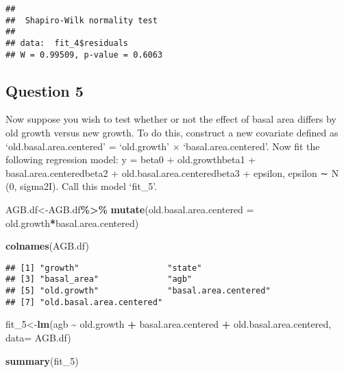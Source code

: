 \documentclass[
]{article}
\newenvironment{Shaded}{\begin{snugshade}}{\end{snugshade}}
\newcommand{\AttributeTok}[1]{\textcolor[rgb]{0.13,0.29,0.53}{#1}}
\newcommand{\FunctionTok}[1]{\textcolor[rgb]{0.13,0.29,0.53}{\textbf{#1}}}
\newcommand{\NormalTok}[1]{#1}
\newcommand{\OtherTok}[1]{\textcolor[rgb]{0.56,0.35,0.01}{#1}}
\newcommand{\SpecialCharTok}[1]{\textcolor[rgb]{0.81,0.36,0.00}{\textbf{#1}}}
\begin{document}
\begin{verbatim}
## 
##  Shapiro-Wilk normality test
## 
## data:  fit_4$residuals
## W = 0.99509, p-value = 0.6063
\end{verbatim}

\hypertarget{question-5}{%
\subsection{Question 5}\label{question-5}}

Now suppose you wish to test whether or not the effect of basal area
differs by old growth versus new growth. To do this, construct a new
covariate defined as `old.basal.area.centered' = `old.growth' ×
`basal.area.centered'. Now fit the following regression model: y = beta0
+ old.growthbeta1 + basal.area.centeredbeta2 +
old.basal.area.centeredbeta3 + epsilon, epsilon ∼ N (0, sigma2I). Call
this model `fit\_5'.

\begin{Shaded}
\begin{Highlighting}[]
\NormalTok{AGB.df}\OtherTok{\textless{}{-}}\NormalTok{AGB.df}\SpecialCharTok{\%\textgreater{}\%}
  \FunctionTok{mutate}\NormalTok{(}\AttributeTok{old.basal.area.centered =}\NormalTok{ old.growth}\SpecialCharTok{*}\NormalTok{basal.area.centered)}

\FunctionTok{colnames}\NormalTok{(AGB.df)}
\end{Highlighting}
\end{Shaded}

\begin{verbatim}
## [1] "growth"                  "state"                  
## [3] "basal_area"              "agb"                    
## [5] "old.growth"              "basal.area.centered"    
## [7] "old.basal.area.centered"
\end{verbatim}

\begin{Shaded}
\begin{Highlighting}[]
\NormalTok{fit\_5}\OtherTok{\textless{}{-}}\FunctionTok{lm}\NormalTok{(agb }\SpecialCharTok{\textasciitilde{}}\NormalTok{ old.growth }\SpecialCharTok{+}\NormalTok{ basal.area.centered }\SpecialCharTok{+}\NormalTok{ old.basal.area.centered, }\AttributeTok{data=}\NormalTok{ AGB.df)}

\FunctionTok{summary}\NormalTok{(fit\_5)}
\end{Highlighting}
\end{Shaded}
\end{document}
